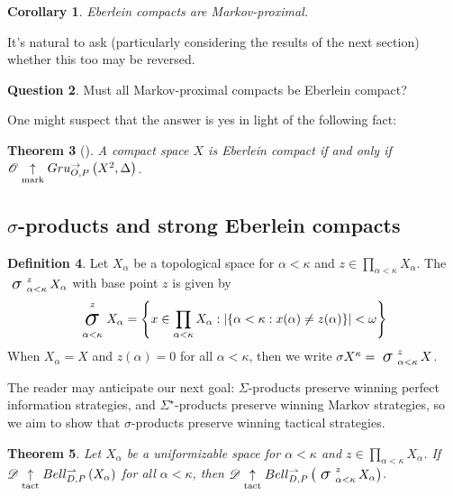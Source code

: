 \documentclass{amsart}
\newtheorem{theorem}{Theorem}[section]
\newtheorem{corollary}[theorem]{Corollary}
\theoremstyle{definition}
\newtheorem{definition}[theorem]{Definition}
\newtheorem{question}[theorem]{Question}
\begin{document}
  \begin{corollary}
    Eberlein compacts are Markov-proximal.
  \end{corollary}

  It's natural to ask (particularly considering the results of the next
  section) whether this too may be reversed.

  \begin{question}\label{mainQuestion}
    Must all Markov-proximal compacts be Eberlein compact?
  \end{question}

  One might suspect that the answer is yes in light of the following fact:

  \begin{theorem}[\cite{MR858337}]
    A compact space \(X\) is Eberlein compact if and only if
    \(\mathscr{O}\underset{\text{mark}}{\uparrow}Gru_{O,P}^{\to}\left({X^2},{\Delta}\right)\).
  \end{theorem}

\subsection{\(\sigma\)-products and strong Eberlein compacts}

  \begin{definition}
    Let \(X_\alpha\) be a topological space for \(\alpha<\kappa\)
    and \(z\in\prod_{\alpha<\kappa}X_\alpha\).
    The  \(\sigmaProd_{\alpha<\kappa}^{z}X_\alpha\)
    with base point \(z\) is given by
    \[
      \sigmaProd_{\alpha<\kappa}^{z}X_\alpha
        =
      \left\{
        x\in \prod_{\alpha<\kappa}X_\alpha
      :
        |\{\alpha<\kappa:x(\alpha)\not=z(\alpha)\}|<\omega
      \right\}
    \]
    When \(X_\alpha=X\) and \(z(\alpha)=0\) for all \(\alpha<\kappa\),
    then we write \(\sigmaPower{X}{\kappa}=\sigmaProd_{\alpha<\kappa}^z X\).
  \end{definition}

  The reader may anticipate our next goal: \(\Sigma\)-products
  preserve winning perfect information strategies, and
  \(\Sigma^\star\)-products preserve winning Markov strategies, so
  we aim to show that \(\sigma\)-products preserve winning
  tactical strategies.

  \begin{theorem}
    Let \(X_\alpha\) be a uniformizable space for \(\alpha<\kappa\)
    and \(z\in \prod_{\alpha<\kappa}X_\alpha\).
    If
    \(\mathscr{D}\underset{\text{tact}}{\uparrow}Bell_{D,P}^{\rightharpoonup}\left({X_\alpha}\right)\) for all \(\alpha<\kappa\),
    then
    \(\pl D\tactwin\bellConGame{\sigmaProd_{\alpha<\kappa}^z X_\alpha}\).
  \end{theorem}
\end{document}
